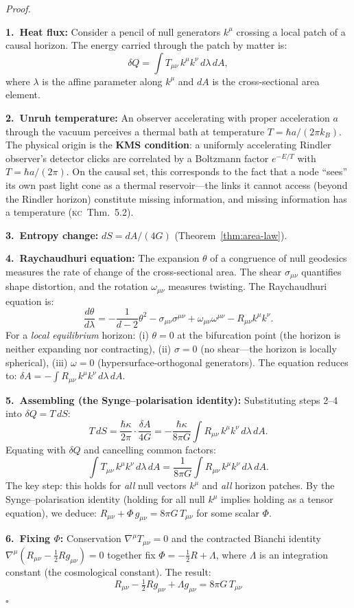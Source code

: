 \documentclass[11pt, a4paper, openany]{book}
\newcommand{\KC}[1]{\textnormal{(\textsc{kc}~#1)}}
\newcounter{thm}[chapter]
\renewenvironment{proof}[1][Proof]{%
  \par\noindent\textit{#1.}\quad
}{\hfill$\square$\par\medskip}
\begin{document}
\begin{proof}
\textbf{1.\ Heat flux:} Consider a pencil of null generators $k^\mu$
crossing a local patch of a causal horizon. The energy carried through
the patch by matter is:
\[
  \delta Q = \int T_{\mu\nu}\,k^\mu k^\nu\,d\lambda\,dA,
\]
where $\lambda$ is the affine parameter along $k^\mu$ and $dA$ is the
cross-sectional area element.

\textbf{2.\ Unruh temperature:} An observer accelerating with proper
acceleration $a$ through the vacuum perceives a thermal bath at
temperature $T = \hbar a/(2\pi k_B)$.  The physical origin is the
\textbf{KMS condition}: a uniformly accelerating Rindler observer's
detector clicks are correlated by a Boltzmann factor $e^{-E/T}$ with
$T = \hbar a/(2\pi)$. On the causal set, this corresponds to the
fact that a node ``sees'' its own past light cone as a thermal
reservoir---the links it cannot access (beyond the Rindler horizon)
constitute missing information, and missing information has a
temperature \KC{Thm.~5.2}.

\textbf{3.\ Entropy change:} $dS = dA/(4G)$
(Theorem~\ref{thm:area-law}).

\textbf{4.\ Raychaudhuri equation:} The expansion $\theta$ of a
congruence of null geodesics measures the rate of change of the
cross-sectional area. The shear $\sigma_{\mu\nu}$ quantifies
shape distortion, and the rotation $\omega_{\mu\nu}$ measures
twisting. The Raychaudhuri equation is:
\[
  \frac{d\theta}{d\lambda} = -\frac{1}{d-2}\theta^2
  - \sigma_{\mu\nu}\sigma^{\mu\nu}
  + \omega_{\mu\nu}\omega^{\mu\nu}
  - R_{\mu\nu}k^\mu k^\nu.
\]
For a \emph{local equilibrium} horizon: (i) $\theta = 0$ at the
bifurcation point (the horizon is neither expanding nor contracting),
(ii) $\sigma = 0$ (no shear---the horizon is locally spherical),
(iii) $\omega = 0$ (hypersurface-orthogonal generators). The equation
reduces to:
$\delta A = -\int R_{\mu\nu}\,k^\mu k^\nu\,d\lambda\,dA$.

\textbf{5.\ Assembling (the Synge--polarisation identity):}
Substituting steps 2--4 into $\delta Q = T\,dS$:
\[
  T\,dS = \frac{\hbar\kappa}{2\pi} \cdot \frac{\delta A}{4G}
  = -\frac{\hbar\kappa}{8\pi G}\int R_{\mu\nu}\,k^\mu k^\nu\,d\lambda\,dA.
\]
Equating with $\delta Q$ and cancelling common factors:
\[
  \int T_{\mu\nu}\,k^\mu k^\nu\,d\lambda\,dA
  = \frac{1}{8\pi G} \int R_{\mu\nu}\,k^\mu k^\nu\,d\lambda\,dA.
\]
The key step: this holds for \emph{all} null vectors $k^\mu$ and
\emph{all} horizon patches. By the Synge--polarisation identity
(holding for all null $k^\mu$ implies holding as a tensor equation),
we deduce:
$R_{\mu\nu} + \Phi\,g_{\mu\nu} = 8\pi G\,T_{\mu\nu}$
for some scalar $\Phi$.

\textbf{6.\ Fixing $\Phi$:} Conservation $\nabla^\mu T_{\mu\nu} = 0$
and the contracted Bianchi identity
$\nabla^\mu(R_{\mu\nu} - \frac{1}{2}Rg_{\mu\nu}) = 0$ together fix
$\Phi = -\frac{1}{2}R + \Lambda$, where $\Lambda$ is an integration
constant (the cosmological constant). The result:
\begin{equation}
  \boxed{R_{\mu\nu} - \tfrac{1}{2}Rg_{\mu\nu} + \Lambda g_{\mu\nu}
  = 8\pi G\,T_{\mu\nu}}
\end{equation}
\end{proof}
\end{document}
